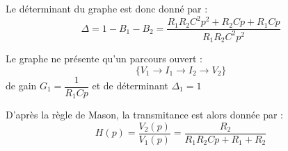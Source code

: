 Le déterminant du graphe est donc donné par :
\[
    \Delta=1-B_1-B_2=\dfrac{R_1R_2C^2p^2+R_2Cp+R_1Cp}{R_1R_2C^2p^2}
\]

Le graphe ne présente qu'un parcours ouvert :
\[
    \{V_1\rightarrow I_1\rightarrow I_2\rightarrow V_2\}
\]
de gain $G_1=\dfrac{1}{R_1Cp}$ et de déterminant $\Delta_1=1$

D'après la règle de Mason, la transmitance est alors donnée par :
\[
    H(p)=\dfrac{V_2(p)}{V_1(p)}=\dfrac{R_2}{R_1R_2Cp+ R_1+R_2}
\]
